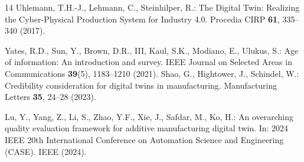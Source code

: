 \begin{thebibliography}{14}
Uhlemann, T.H.-J., Lehmann, C., Steinhilper, R.: The Digital Twin: Realizing the Cyber-Physical Production System for Industry 4.0. Procedia CIRP \textbf{61}, 335--340 (2017). 

Yates, R.D., Sun, Y., Brown, D.R., III, Kaul, S.K., Modiano, E., Ulukus, S.: Age of information: An introduction and survey. IEEE Journal on Selected Areas in Communications \textbf{39}(5), 1183--1210 (2021). 
Shao, G., Hightower, J., Schindel, W.: Credibility consideration for digital twins in manufacturing. Manufacturing Letters \textbf{35}, 24--28 (2023). 

Lu, Y., Yang, Z., Li, S., Zhao, Y.F., Xie, J., Safdar, M., Ko, H.: An overarching quality evaluation framework for additive manufacturing digital twin. In: 2024 IEEE 20th International Conference on Automation Science and Engineering (CASE). IEEE (2024). 
\end{thebibliography}
